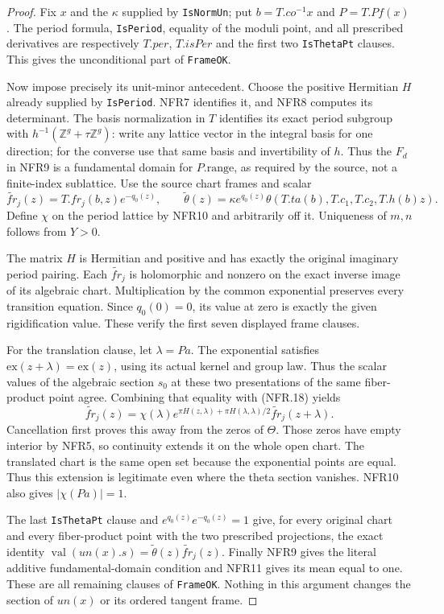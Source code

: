 \documentclass[11pt,a4paper]{article}
\numberwithin{equation}{section}
\theoremstyle{remark}\newtheorem{remark}[theorem]{Remark}
\begin{document}
\begin{proof}
Fix $x$ and the $\kappa$ supplied by \texttt{Is\allowbreak Norm\allowbreak Un}; put
$b=T.co^{-1}x$ and $P=T.Pf(x)$.
The period formula, \texttt{Is\allowbreak Period}, equality of the moduli
point, and all prescribed derivatives are respectively $T.per$,
$T.isPer$ and the first two \texttt{Is\allowbreak Theta\allowbreak Pt} clauses.
This gives the unconditional part of \texttt{Frame\allowbreak OK}.

Now impose precisely its unit-minor antecedent.
Choose the positive Hermitian $H$ already supplied by
\texttt{Is\allowbreak Period}.  NFR7 identifies it, and NFR8 computes its
determinant.  The basis normalization in $T$ identifies its exact
period subgroup with $h^{-1}(\mathbb Z^g+\tau\mathbb Z^g)$:
write any lattice vector in the integral basis for one direction;
for the converse use that same basis and invertibility of $h$.
Thus the $F_d$ in NFR9 is a fundamental domain for $P.\mathrm{range}$,
as required by the source, not a finite-index sublattice.
Use the source chart frames and scalar
\[
 \widetilde{fr}_j(z)=T.fr_j(b,z)e^{-q_0(z)},\qquad
 \widetilde\theta(z)=\kappa e^{q_0(z)}\theta(T.ta(b),T.c_1,T.c_2,T.h(b)z).
 \tag{NFR.22}
\]
Define $\chi$ on the period lattice by NFR10 and arbitrarily
off it.  Uniqueness of $m,n$ follows from $Y>0$.

The matrix $H$ is Hermitian and positive and has exactly the
original imaginary period pairing.  Each $\widetilde{fr}_j$ is
holomorphic and nonzero on the exact inverse image of its
algebraic chart.  Multiplication by the common exponential
preserves every transition equation.  Since $q_0(0)=0$, its
value at zero is exactly the given rigidification value.
These verify the first seven displayed frame clauses.

For the translation clause, let $\lambda=Pa$.
The exponential satisfies $\mathrm{ex}(z+\lambda)=\mathrm{ex}(z)$,
using its actual kernel and group law.  Thus the scalar values
of the algebraic section $s_0$ at these two presentations of
the same fiber-product point agree.  Combining that equality
with (NFR.18) yields
\[
 \widetilde{fr}_j(z)=\chi(\lambda)
    e^{\pi H(z,\lambda)+\pi H(\lambda,\lambda)/2}
                           \widetilde{fr}_j(z+\lambda).
 \tag{NFR.23}
\]
Cancellation first proves this away from the zeros of $\Theta$.
Those zeros have empty interior by NFR5, so continuity extends
it on the whole open chart.  The translated chart is the same
open set because the exponential points are equal.  Thus this
extension is legitimate even where the theta section vanishes.
NFR10 also gives $|\chi(Pa)|=1$.

The last \texttt{Is\allowbreak Theta\allowbreak Pt} clause and
$e^{q_0(z)}e^{-q_0(z)}=1$ give, for every original chart and
every fiber-product point with the two prescribed projections,
the exact identity
$\operatorname{val}(un(x).s)=\widetilde\theta(z)
\widetilde{fr}_j(z)$.  Finally NFR9 gives the literal additive
fundamental-domain condition and NFR11 gives its mean equal to
one.  These are all remaining clauses of \texttt{Frame\allowbreak OK}.
Nothing in this argument changes the section of $un(x)$ or its
ordered tangent frame.
\end{proof}
\end{document}
